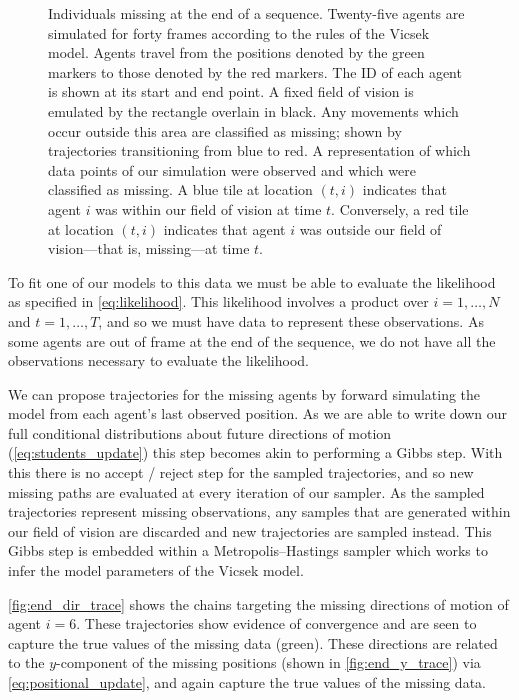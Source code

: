 \begin{figure}[tbp]
\begin{subfigure}[b]{0.5\textwidth}
    \caption{}
    \label{subfig:end_missing}
  \end{subfigure}
  \caption{Individuals missing at the end of a sequence.
   Twenty-five agents are simulated for forty frames
  according to the rules of the Vicsek model. Agents travel from the positions
  denoted by the green markers to those denoted by the red markers. The ID of
  each agent is shown at its start and end point. A fixed field of vision is
  emulated by the rectangle overlain in black. Any movements which occur
  outside this area are classified as missing; shown by trajectories
  transitioning from blue to red.
   A representation of which data points of our
  simulation were observed and which were classified as missing. A blue tile at
  location $(t, i)$ indicates that agent $i$ was within our field of vision at
  time $t$. Conversely, a red tile at location $(t, i)$ indicates that agent
  $i$ was outside our field of vision---that is, missing---at time $t$.}
  \label{fig:end_data}
\end{figure}

To fit one of our models to this data we must be able to evaluate the
likelihood as specified in \cref{eq:likelihood}. This likelihood involves a
product over $i=1,\ldots,N$ and $t=1,\ldots,T$, and so we must have data to
represent these observations. As some agents are out of frame at the end of the
sequence, we do not have all the observations necessary to evaluate the
likelihood.

We can propose trajectories for the missing agents by forward simulating the
model from each agent's last observed position. As we are able to write down
our full conditional distributions about future directions of motion
(\cref{eq:students_update}) this step becomes akin to performing a Gibbs step.
With this there is no accept / reject step for the sampled trajectories, and so
new missing paths are evaluated at every iteration of our sampler. As the
sampled trajectories represent missing observations, any samples that are
generated within our field of vision are discarded and new trajectories are
sampled instead. This Gibbs step is embedded within a Metropolis--Hastings
sampler which works to infer the model parameters of the Vicsek model.

\cref{fig:end_dir_trace} shows the chains targeting the missing directions of
motion of agent $i=6$. These trajectories show evidence of convergence and are
seen to capture the true values of the missing data (green). These directions
are related to the $y$-component of the missing positions (shown in
\cref{fig:end_y_trace}) via \cref{eq:positional_update}, and again capture the
true values of the missing data.

